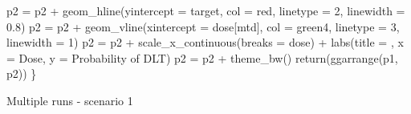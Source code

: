 \documentclass[
]{article}
\newenvironment{Shaded}{\begin{snugshade}}{\end{snugshade}}
\newcommand{\AttributeTok}[1]{\textcolor[rgb]{0.77,0.63,0.00}{#1}}
\newcommand{\DecValTok}[1]{\textcolor[rgb]{0.00,0.00,0.81}{#1}}
\newcommand{\FloatTok}[1]{\textcolor[rgb]{0.00,0.00,0.81}{#1}}
\newcommand{\FunctionTok}[1]{\textcolor[rgb]{0.00,0.00,0.00}{#1}}
\newcommand{\NormalTok}[1]{#1}
\newcommand{\OtherTok}[1]{\textcolor[rgb]{0.56,0.35,0.01}{#1}}
\newcommand{\SpecialCharTok}[1]{\textcolor[rgb]{0.00,0.00,0.00}{#1}}
\newcommand{\StringTok}[1]{\textcolor[rgb]{0.31,0.60,0.02}{#1}}
\begin{document}
\begin{Shaded}
\begin{Highlighting}[]
\NormalTok{p2 }\OtherTok{=}\NormalTok{ p2 }\SpecialCharTok{+} \FunctionTok{geom\_hline}\NormalTok{(}\AttributeTok{yintercept =}\NormalTok{ target, }\AttributeTok{col =} \StringTok{\textquotesingle{}red\textquotesingle{}}\NormalTok{, }\AttributeTok{linetype =} \DecValTok{2}\NormalTok{, }\AttributeTok{linewidth =} \FloatTok{0.8}\NormalTok{) }
\NormalTok{p2 }\OtherTok{=}\NormalTok{ p2 }\SpecialCharTok{+} \FunctionTok{geom\_vline}\NormalTok{(}\AttributeTok{xintercept =}\NormalTok{ dose[mtd], }\AttributeTok{col =} \StringTok{\textquotesingle{}green4\textquotesingle{}}\NormalTok{, }\AttributeTok{linetype =} \DecValTok{3}\NormalTok{, }\AttributeTok{linewidth =} \DecValTok{1}\NormalTok{)}
\NormalTok{p2 }\OtherTok{=}\NormalTok{ p2 }\SpecialCharTok{+} \FunctionTok{scale\_x\_continuous}\NormalTok{(}\AttributeTok{breaks =}\NormalTok{ dose) }\SpecialCharTok{+} \FunctionTok{labs}\NormalTok{(}\AttributeTok{title =} \StringTok{\textquotesingle{}\textquotesingle{}}\NormalTok{, }\AttributeTok{x =} \StringTok{\textquotesingle{}Dose\textquotesingle{}}\NormalTok{, }\AttributeTok{y =} \StringTok{\textquotesingle{}Probability of DLT\textquotesingle{}}\NormalTok{)}
\NormalTok{p2 }\OtherTok{=}\NormalTok{ p2 }\SpecialCharTok{+} \FunctionTok{theme\_bw}\NormalTok{() }
\FunctionTok{return}\NormalTok{(}\FunctionTok{ggarrange}\NormalTok{(p1, p2))}
\NormalTok{\}}
\end{Highlighting}
\end{Shaded}

Multiple runs - scenario 1
\end{document}
